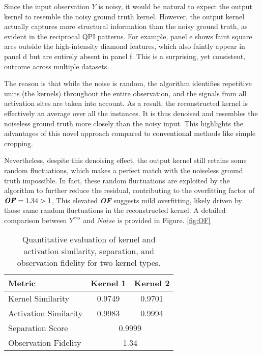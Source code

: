 Since the input observation $Y$ is noisy, it would be natural to expect the output kernel to resemble the noisy ground truth kernel. However, the output kernel actually captures more structural information than the noisy ground truth, as evident in the reciprocal \ac{QPI} patterns. For example, panel e shows faint square arcs outside the high-intensity diamond features, which also faintly appear in panel d but are entirely absent in panel f. This is a surprising, yet consistent, outcome across multiple datasets.

The reason is that while the noise is random, the algorithm identifies repetitive units (the kernels) throughout the entire observation, and the signals from all activation sites are taken into account. As a result, the reconstructed kernel is effectively an average over all the instances. It is thus denoised and resembles the noiseless ground truth more closely than the noisy input. This highlights the advantages of this novel approach compared to conventional methods like simple cropping.

Nevertheless, despite this denoising effect, the output kernel still retains some random fluctuations, which makes a perfect match with the noiseless ground truth impossible. In fact, these random fluctuations are exploited by the algorithm to further reduce the residual, contributing to the overfitting factor of $\textbf{\textit{OF}} = 1.34 > 1 $, This elevated \textbf{\textit{OF}} suggests mild overfitting, likely driven by those same random fluctuations in the reconstructed kernel. A detailed comparison between $Y^{res}$ and $Noise$ is provided in Figure. \ref{fig:OF}

\begin{table}[h]
	\label{table:metric}
	\centering
	\begin{tabular}{|l|c|c|}
		\hline
		\textbf{Metric} & \textbf{Kernel 1} & \textbf{Kernel 2} \\
		\hline
		Kernel Similarity & 0.9749 & 0.9701 \\
		\hline
		Activation Similarity & 0.9983 & 0.9994 \\
		\hline
		Separation Score & \multicolumn{2}{c|}{0.9999} \\
		\hline
		Observation Fidelity & \multicolumn{2}{c|}{1.34} \\
		\hline
	\end{tabular}
	\caption{Quantitative evaluation of kernel and activation similarity, separation, and observation fidelity for two kernel types.}
\end{table}

